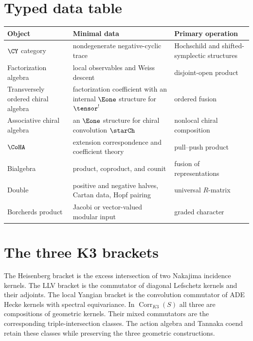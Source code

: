 \chapter{Typed data table}
\begin{center}
\small
\begin{tabularx}{0.98\textwidth}{@{}>{\raggedright\arraybackslash}p{}>{\raggedright\arraybackslash}X>{\raggedright\arraybackslash}p{}@{}}
\toprule
\textbf{Object}&\textbf{Minimal data}&\textbf{Primary operation}\\
\midrule
$\CY$ category&nondegenerate negative-cyclic trace&Hochschild and shifted-symplectic structures\\
Factorization algebra&local observables and Weiss descent&disjoint-open product\\
Transversely ordered chiral algebra&factorization coefficient with an internal $\Eone$ structure for $\tensor^!$&ordered fusion\\
Associative chiral algebra&an $\Eone$ structure for chiral convolution $\starCh$&nonlocal chiral composition\\
$\CoHA$&extension correspondence and coefficient theory&pull--push product\\
Bialgebra&product, coproduct, and counit&fusion of representations\\
Double&positive and negative halves, Cartan data, Hopf pairing&universal $R$-matrix\\
Borcherds product&Jacobi or vector-valued modular input&graded character\\
\bottomrule
\end{tabularx}
\end{center}

\chapter{The three K3 brackets}
The Heisenberg bracket is the excess intersection of two Nakajima incidence kernels.  The LLV bracket is the commutator of diagonal Lefschetz kernels and their adjoints.  The local Yangian bracket is the convolution commutator of ADE Hecke kernels with spectral equivariance.  In $\operatorname{Corr}_{K3}(S)$ all three are compositions of geometric kernels.  Their mixed commutators are the corresponding triple-intersection classes.  The action algebra and Tannaka coend retain these classes while preserving the three geometric constructions.

